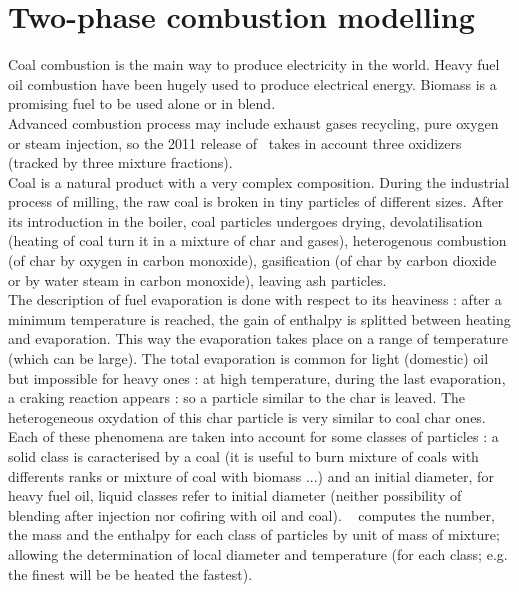 \section*{Two-phase combustion modelling}


Coal combustion is the main way to produce electricity in the world. Heavy fuel
oil combustion have been hugely used to produce electrical energy.
Biomass is a promising fuel to be used alone or in blend.\\
Advanced combustion process may include exhaust gases recycling, pure oxygen or
steam injection, so the 2011 release of \CS ~takes in account
three oxidizers (tracked by three mixture fractions).\\
Coal is a natural product with a very complex composition. During the industrial
process of milling, the raw coal is broken in tiny particles of different
sizes. After its introduction in the boiler, coal particles undergoes drying,
devolatilisation (heating of coal turn it in a mixture of char and gases),
heterogenous combustion (of char by oxygen in carbon monoxide), gasification (of
char by carbon
dioxide or by water steam in carbon monoxide), leaving ash particles.\\
The description of fuel evaporation is done with respect to its heaviness :
after a minimum temperature is reached, the gain of enthalpy is splitted between
heating and evaporation. This way the evaporation takes place on a range of
temperature (which can be large). The total evaporation is common for light
(domestic) oil but impossible for heavy ones : at high temperature, during the
last evaporation, a craking reaction appears : so a particle similar to the char
is leaved. The heterogeneous oxydation of this char particle is very similar to
coal char ones.\\
Each of these phenomena are taken into account for some classes of particles : a
solid class is caracterised by a coal (it is useful to burn mixture of coals
with differents ranks or mixture of coal with biomass ...) and an initial
diameter, for heavy fuel oil, liquid classes refer to initial diameter (neither
possibility of blending after injection nor cofiring with oil and coal). \CS~
computes the number, the mass and the enthalpy for each class of particles by
unit of mass of mixture; allowing the determination of local diameter and
temperature (for each class;
e.g. the finest will be be heated the fastest).\\
